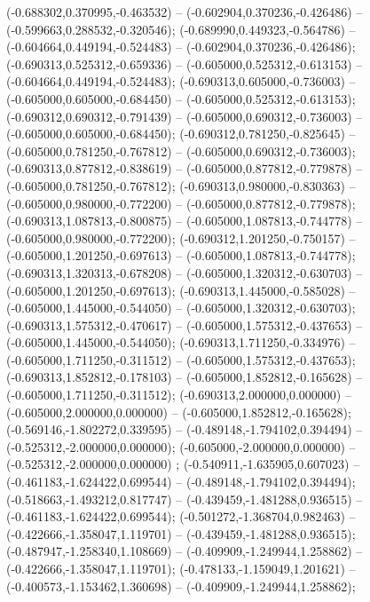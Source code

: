  (-0.688302,0.370995,-0.463532) -- (-0.602904,0.370236,-0.426486) -- (-0.599663,0.288532,-0.320546);
 (-0.689990,0.449323,-0.564786) -- (-0.604664,0.449194,-0.524483) -- (-0.602904,0.370236,-0.426486);
 (-0.690313,0.525312,-0.659336) -- (-0.605000,0.525312,-0.613153) -- (-0.604664,0.449194,-0.524483);
 (-0.690313,0.605000,-0.736003) -- (-0.605000,0.605000,-0.684450) -- (-0.605000,0.525312,-0.613153);
 (-0.690312,0.690312,-0.791439) -- (-0.605000,0.690312,-0.736003) -- (-0.605000,0.605000,-0.684450);
 (-0.690312,0.781250,-0.825645) -- (-0.605000,0.781250,-0.767812) -- (-0.605000,0.690312,-0.736003);
 (-0.690313,0.877812,-0.838619) -- (-0.605000,0.877812,-0.779878) -- (-0.605000,0.781250,-0.767812);
 (-0.690313,0.980000,-0.830363) -- (-0.605000,0.980000,-0.772200) -- (-0.605000,0.877812,-0.779878);
 (-0.690313,1.087813,-0.800875) -- (-0.605000,1.087813,-0.744778) -- (-0.605000,0.980000,-0.772200);
 (-0.690312,1.201250,-0.750157) -- (-0.605000,1.201250,-0.697613) -- (-0.605000,1.087813,-0.744778);
 (-0.690313,1.320313,-0.678208) -- (-0.605000,1.320312,-0.630703) -- (-0.605000,1.201250,-0.697613);
 (-0.690313,1.445000,-0.585028) -- (-0.605000,1.445000,-0.544050) -- (-0.605000,1.320312,-0.630703);
 (-0.690313,1.575312,-0.470617) -- (-0.605000,1.575312,-0.437653) -- (-0.605000,1.445000,-0.544050);
 (-0.690313,1.711250,-0.334976) -- (-0.605000,1.711250,-0.311512) -- (-0.605000,1.575312,-0.437653);
 (-0.690313,1.852812,-0.178103) -- (-0.605000,1.852812,-0.165628) -- (-0.605000,1.711250,-0.311512);
 (-0.690313,2.000000,0.000000) -- (-0.605000,2.000000,0.000000) -- (-0.605000,1.852812,-0.165628);
 (-0.569146,-1.802272,0.339595) -- (-0.489148,-1.794102,0.394494) -- (-0.525312,-2.000000,0.000000);
 (-0.605000,-2.000000,0.000000) -- (-0.525312,-2.000000,0.000000) ;
 (-0.540911,-1.635905,0.607023) -- (-0.461183,-1.624422,0.699544) -- (-0.489148,-1.794102,0.394494);
 (-0.518663,-1.493212,0.817747) -- (-0.439459,-1.481288,0.936515) -- (-0.461183,-1.624422,0.699544);
 (-0.501272,-1.368704,0.982463) -- (-0.422666,-1.358047,1.119701) -- (-0.439459,-1.481288,0.936515);
 (-0.487947,-1.258340,1.108669) -- (-0.409909,-1.249944,1.258862) -- (-0.422666,-1.358047,1.119701);
 (-0.478133,-1.159049,1.201621) -- (-0.400573,-1.153462,1.360698) -- (-0.409909,-1.249944,1.258862);
